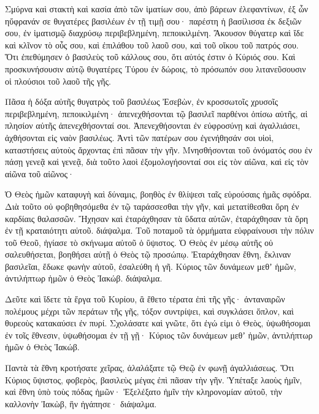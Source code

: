 \begin{spacing}{1.1}
\begin{multicols}{2}
Σμύρνα καὶ στακτὴ καὶ κασία ἀπὸ τῶν ἱματίων σου, ἀπὸ βάρεων ἐλεφαντίνων, ἐξ ὧν ηὔφρανάν σε
θυγατέρες βασιλέων ἐν τῇ τιμῇ σου· παρέστη ἡ βασίλισσα ἐκ δεξιῶν σου, ἐν ἱματισμῷ διαχρύσῳ περιβεβλημένη, πεποικιλμένη.
Ἄκουσον θύγατερ καὶ ἴδε καὶ κλῖνον τὸ οὖς σου, καὶ ἐπιλάθου τοῦ λαοῦ σου, καὶ τοῦ οἴκου τοῦ πατρός σου.
Ὅτι ἐπεθύμησεν ὁ βασιλεὺς τοῦ κάλλους σου, ὅτι αὐτός ἐστιν ὁ Κύριός σου.
Καὶ προσκυνήσουσιν αὐτῷ θυγατέρες Τύρου ἐν δώροις, τὸ πρόσωπόν σου λιτανεῦσουσιν οἱ πλούσιοι τοῦ λαοῦ τῆς γῆς.

Πᾶσα ἡ δόξα αὐτῆς θυγατρὸς τοῦ βασιλέως Ἐσεβὼν, ἐν κροσσωτοῖς χρυσοῖς περιβεβλημένη, πεποικιλμένη·
ἀπενεχθήσονται τῷ βασιλεῖ παρθένοι ὀπίσω αὐτῆς, αἱ πλησίον αὐτῆς ἀπενεχθήσονταί σοι.
Ἀπενεχθήσονται ἐν εὐφροσύνῃ καὶ ἀγαλλιάσει, ἀχθήσονται εἰς ναὸν βασιλέως.
Ἀντὶ τῶν πατέρων σου ἐγενήθησάν σοι υἱοὶ, καταστήσεις αὐτοὺς ἄρχοντας ἐπὶ πᾶσαν τὴν γῆν.
Μνησθήσονται τοῦ ὀνόματός σου ἐν πάσῃ γενεᾷ καὶ γενεᾷ, διὰ τοῦτο λαοὶ ἐξομολογήσονταί σοι εἰς τὸν αἰῶνα, καὶ εἰς τὸν αἰῶνα τοῦ αἰῶνος·

Ὁ Θεὸς ἡμῶν καταφυγὴ καὶ δύναμις, βοηθὸς ἐν θλίψεσι ταῖς εὑρούσαις ἡμᾶς σφόδρα.
Διὰ τοῦτο οὐ φοβηθησόμεθα ἐν τῷ ταράσσεσθαι τὴν γῆν, καὶ μετατίθεσθαι ὄρη ἐν καρδίαις θαλασσῶν.
Ἤχησαν καὶ ἐταράχθησαν τὰ ὕδατα αὐτῶν, ἐταράχθησαν τὰ ὄρη ἐν τῇ κραταιότητι αὐτοῦ. διάψαλμα.
Τοῦ ποταμοῦ τὰ ὁρμήματα εὐφραίνουσι τὴν πόλιν τοῦ Θεοῦ, ἡγίασε τὸ σκήνωμα αὐτοῦ ὁ ὕψιστος.
Ὁ Θεὸς ἐν μέσῳ αὐτῆς οὐ σαλευθήσεται, βοηθήσει αὐτῇ ὁ Θεὸς τῷ προσώπῳ.
Ἐταράχθησαν ἔθνη, ἔκλιναν βασιλεῖαι, ἔδωκε φωνὴν αὐτοῦ, ἐσαλεύθη ἡ γῆ.
Κύριος τῶν δυνάμεων μεθʼ ἡμῶν, ἀντιλήπτωρ ἡμῶν ὁ Θεὸς Ἰακώβ. διάψαλμα.

Δεῦτε καὶ ἴδετε τὰ ἔργα τοῦ Κυρίου, ἃ ἔθετο τέρατα ἐπὶ τῆς γῆς·
ἀνταναιρῶν πολέμους μέχρι τῶν περάτων τῆς γῆς, τόξον συντρίψει, καὶ συγκλάσει ὅπλον, καὶ θυρεοὺς κατακαύσει ἐν πυρί.
Σχολάσατε καὶ γνῶτε, ὅτι ἐγώ εἰμι ὁ Θεὸς, ὑψωθήσομαι ἐν τοῖς ἔθνεσιν, ὑψωθήσομαι ἐν τῇ γῇ·
Κύριος τῶν δυνάμεων μεθʼ ἡμῶν, ἀντιλήπτωρ ἡμῶν ὁ Θεὸς Ἰακώβ.

Παντὰ τὰ ἔθνη κροτήσατε χεῖρας, ἀλαλάξατε τῷ Θεῷ ἐν φωνῇ ἀγαλλιάσεως.
Ὅτι Κύριος ὕψιστος, φοβερὸς, βασιλεὺς μέγας ἐπὶ πᾶσαν τὴν γῆν.
Ὑπέταξε λαοὺς ἡμῖν, καὶ ἔθνη ὑπὸ τοὺς πόδας ἡμῶν·
Ἐξελέξατο ἡμῖν τὴν κληρονομίαν αὐτοῦ, τὴν καλλονὴν Ἰακὼβ, ἣν ἠγάπησε· διάψαλμα.


\end{multicols}
\end{spacing}
